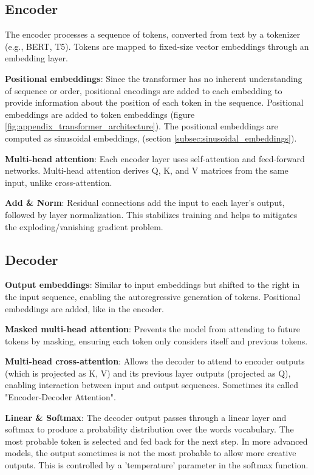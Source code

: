 \subsection*{Encoder}

The encoder processes a sequence of tokens, converted from text by a tokenizer (e.g., BERT, T5). Tokens are mapped to fixed-size vector embeddings through an embedding layer.

\textbf{Positional embeddings}: Since the transformer has no inherent understanding of sequence or order, positional encodings are added to each embedding to provide information about the position of each token in the sequence. Positional embeddings are added to token embeddings (figure \ref{fig:appendix_transformer_architecture}). The positional embeddings are computed as sinusoidal embeddings, (section \ref{subsec:sinusoidal_embeddings}).

\textbf{Multi-head attention}: Each encoder layer uses self-attention and feed-forward networks. Multi-head attention derives Q, K, and V matrices from the same input, unlike cross-attention.

\textbf{Add & Norm}: Residual connections add the input to each layer's output, followed by layer normalization. This stabilizes training and helps to mitigates the exploding/vanishing gradient problem.









\subsection*{Decoder}

\textbf{Output embeddings}: Similar to input embeddings but shifted to the right in the input sequence, enabling the autoregressive generation of tokens. Positional embeddings are added, like in the encoder.

\textbf{Masked multi-head attention}: Prevents the model from attending to future tokens by masking, ensuring each token only considers itself and previous tokens.

\textbf{Multi-head cross-attention}: Allows the decoder to attend to encoder outputs (which is projected as K, V) and its previous layer outputs (projected as Q), enabling interaction between input and output sequences. Sometimes its called "Encoder-Decoder Attention".

\textbf{Linear \& Softmax}: The decoder output passes through a linear layer and softmax to produce a probability distribution over the words vocabulary. The most probable token is selected and fed back for the next step. In more advanced models, the output sometimes is not the most probable to allow more creative outputs. This is controlled by a 'temperature' parameter in the softmax function.

